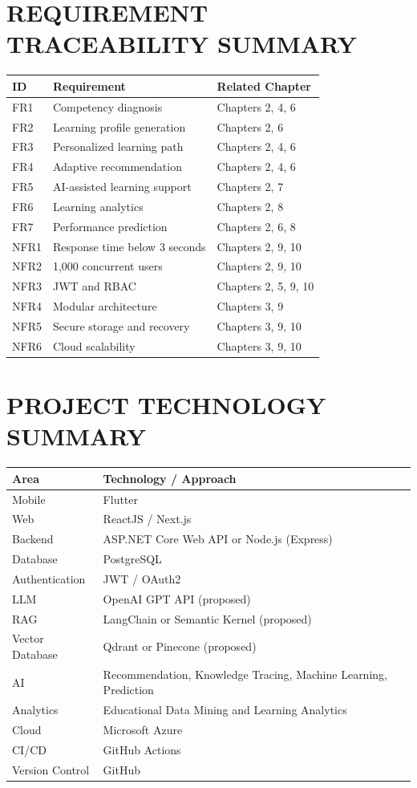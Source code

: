 \appendix

\chapter{REQUIREMENT TRACEABILITY SUMMARY}

\begin{longtable}{p{}p{}p{}}
\toprule
\textbf{ID} & \textbf{Requirement} & \textbf{Related Chapter}\\
\midrule
FR1 & Competency diagnosis & Chapters 2, 4, 6\\
FR2 & Learning profile generation & Chapters 2, 6\\
FR3 & Personalized learning path & Chapters 2, 4, 6\\
FR4 & Adaptive recommendation & Chapters 2, 4, 6\\
FR5 & AI-assisted learning support & Chapters 2, 7\\
FR6 & Learning analytics & Chapters 2, 8\\
FR7 & Performance prediction & Chapters 2, 6, 8\\
NFR1 & Response time below 3 seconds & Chapters 2, 9, 10\\
NFR2 & 1,000 concurrent users & Chapters 2, 9, 10\\
NFR3 & JWT and RBAC & Chapters 2, 5, 9, 10\\
NFR4 & Modular architecture & Chapters 3, 9\\
NFR5 & Secure storage and recovery & Chapters 3, 9, 10\\
NFR6 & Cloud scalability & Chapters 3, 9, 10\\
\bottomrule
\end{longtable}

\chapter{PROJECT TECHNOLOGY SUMMARY}

\begin{longtable}{p{}p{}}
\toprule
\textbf{Area} & \textbf{Technology / Approach}\\
\midrule
Mobile & Flutter\\
Web & ReactJS / Next.js\\
Backend & ASP.NET Core Web API or Node.js (Express)\\
Database & PostgreSQL\\
Authentication & JWT / OAuth2\\
LLM & OpenAI GPT API (proposed)\\
RAG & LangChain or Semantic Kernel (proposed)\\
Vector Database & Qdrant or Pinecone (proposed)\\
AI & Recommendation, Knowledge Tracing, Machine Learning, Prediction\\
Analytics & Educational Data Mining and Learning Analytics\\
Cloud & Microsoft Azure\\
CI/CD & GitHub Actions\\
Version Control & GitHub\\
\bottomrule
\end{longtable}


